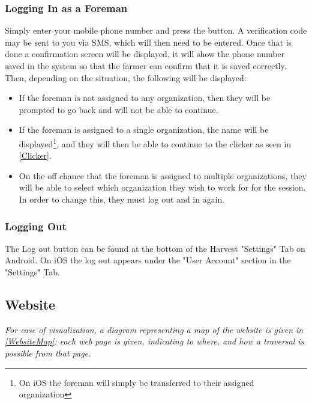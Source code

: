 \documentclass[11pt]{article}
\begin{document}
\subsubsection{Logging In as a Foreman}

Simply enter your mobile phone number and press the button. A verification code may be sent to you via SMS, which will then need to be entered. Once that is done a confirmation screen will be displayed, it will show the phone number saved in the system so that the farmer can confirm that it is saved correctly. Then, depending on the situation, the following will be displayed:
\begin{itemize}
 \item If the foreman is not assigned to any organization, then they will be prompted to go back and will not be able to continue.
 \item If the foreman is assigned to a single organization, the name will be displayed\footnote{On iOS the foreman will simply be transferred to their assigned organization}, and they will then be able to continue to the clicker as seen in \ref{Clicker}.
 \item On the off chance that the foreman is assigned to multiple organizations, they will be able to select which organization they wish to work for for the session. In order to change this, they must log out and in again.
\end{itemize}

\subsubsection{Logging Out}
The Log out button can be found at the bottom of the Harvest "Settings" Tab on Android. On iOS the log out appears under the "User Account" section in the "Settings" Tab.

\subsection{Website}


\textit{For ease of visualization, a diagram representing a map of the website is given in \ref{WebsiteMap}: each web page is given, indicating to where, and how a traversal is possible from that page.}
\end{document}
